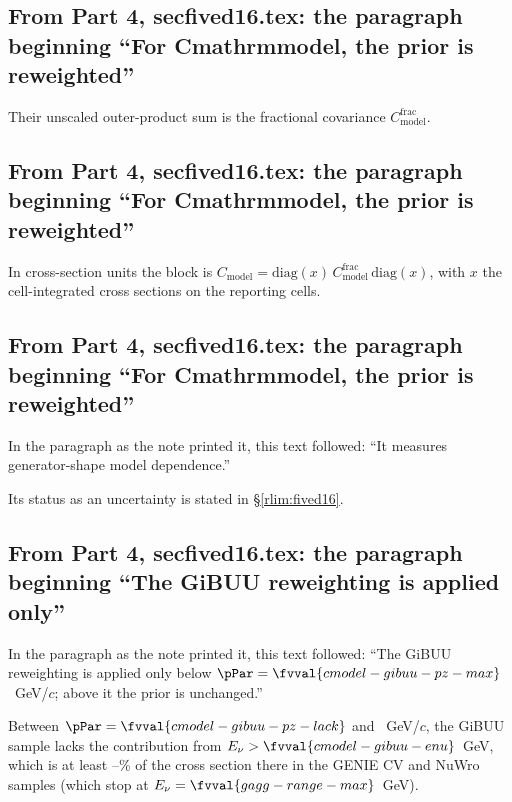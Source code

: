 \subsection{From Part 4, secfived16.tex: the paragraph beginning ``For Cmathrmmodel, the prior is reweighted''}
Their unscaled outer-product sum is the fractional covariance $C_{\mathrm{model}}^{\mathrm{frac}}$.

\subsection{From Part 4, secfived16.tex: the paragraph beginning ``For Cmathrmmodel, the prior is reweighted''}
In cross-section units the block is $C_{\mathrm{model}}=\mathrm{diag}(x)\,C_{\mathrm{model}}^{\mathrm{frac}}\,\mathrm{diag}(x)$, with $x$ the cell-integrated cross sections on the reporting cells.

\subsection{From Part 4, secfived16.tex: the paragraph beginning ``For Cmathrmmodel, the prior is reweighted''}
In the paragraph as the note printed it, this text followed: ``It measures generator-shape model dependence.''\par
Its status as an uncertainty is stated in \S\ref{rlim:fived16}.

\subsection{From Part 4, secfived16.tex: the paragraph beginning ``The GiBUU reweighting is applied only''}
In the paragraph as the note printed it, this text followed: ``The GiBUU reweighting is applied only below $\pPar=\fvval{cmodel-gibuu-pz-max}$~GeV/$c$; above it the prior is unchanged.''\par
Between $\pPar=\fvval{cmodel-gibuu-pz-lack}$ and ~GeV/$c$, the GiBUU sample lacks the contribution from $E_\nu>\fvval{cmodel-gibuu-enu}$~GeV, which is at least --\% of the cross section there in the GENIE CV and NuWro samples (which stop at $E_\nu=\fvval{gagg-range-max}$~GeV).

